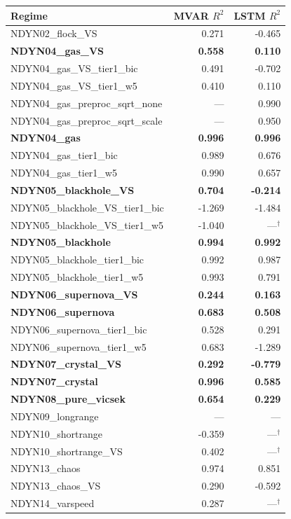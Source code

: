 \begin{minipage}[t]{0.49\textwidth}
\begin{tabular}{@{}lrr@{}}
\hline
Regime & MVAR $R^2$ & LSTM $R^2$ \\
\hline
NDYN02\_flock\_VS & 0.271 & -0.465 \\
\textbf{NDYN04\_gas\_VS} & \textbf{0.558} & \textbf{0.110} \\
NDYN04\_gas\_VS\_tier1\_bic & 0.491 & -0.702 \\
NDYN04\_gas\_VS\_tier1\_w5 & 0.410 & 0.110 \\
NDYN04\_gas\_preproc\_sqrt\_none & --- & 0.990 \\
NDYN04\_gas\_preproc\_sqrt\_scale & --- & 0.950 \\
\textbf{NDYN04\_gas} & \textbf{0.996} & \textbf{0.996} \\
NDYN04\_gas\_tier1\_bic & 0.989 & 0.676 \\
NDYN04\_gas\_tier1\_w5 & 0.990 & 0.657 \\
\textbf{NDYN05\_blackhole\_VS} & \textbf{0.704} & \textbf{-0.214} \\
NDYN05\_blackhole\_VS\_tier1\_bic & -1.269 & -1.484 \\
NDYN05\_blackhole\_VS\_tier1\_w5 & -1.040 & ---$^\dagger$ \\
\textbf{NDYN05\_blackhole} & \textbf{0.994} & \textbf{0.992} \\
NDYN05\_blackhole\_tier1\_bic & 0.992 & 0.987 \\
NDYN05\_blackhole\_tier1\_w5 & 0.993 & 0.791 \\
\textbf{NDYN06\_supernova\_VS} & \textbf{0.244} & \textbf{0.163} \\
\textbf{NDYN06\_supernova} & \textbf{0.683} & \textbf{0.508} \\
NDYN06\_supernova\_tier1\_bic & 0.528 & 0.291 \\
NDYN06\_supernova\_tier1\_w5 & 0.683 & -1.289 \\
\textbf{NDYN07\_crystal\_VS} & \textbf{0.292} & \textbf{-0.779} \\
\textbf{NDYN07\_crystal} & \textbf{0.996} & \textbf{0.585} \\
\textbf{NDYN08\_pure\_vicsek} & \textbf{0.654} & \textbf{0.229} \\
NDYN09\_longrange & --- & --- \\
NDYN10\_shortrange & -0.359 & ---$^\dagger$ \\
NDYN10\_shortrange\_VS & 0.402 & ---$^\dagger$ \\
NDYN13\_chaos & 0.974 & 0.851 \\
NDYN13\_chaos\_VS & 0.290 & -0.592 \\
NDYN14\_varspeed & 0.287 & ---$^\dagger$ \\
\hline
\end{tabular}
\end{minipage}
